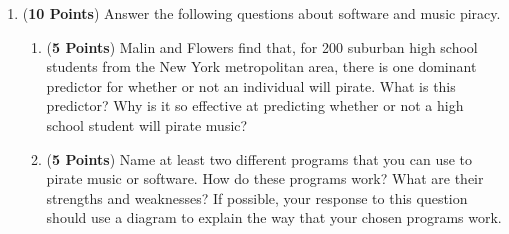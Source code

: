 \documentclass[12pt]{article}
\begin{document}
\begin{enumerate}
\newpage






\item ({\bf 10 Points}) Answer the following questions about software
  and music piracy.

\begin{enumerate}

\item ({\bf 5 Points}) Malin and Flowers find that, for 200 suburban
  high school students from the New York metropolitan area, there is
  one dominant predictor for whether or not an individual will pirate.
  What is this predictor?  Why is it so effective at predicting
  whether or not a high school student will pirate music?


\item ({\bf 5 Points}) Name at least two different programs that you
  can use to pirate music or software.  How do these programs work?
  What are their strengths and weaknesses?  If possible, your response
  to this question should use a diagram to explain the way that your
  chosen programs work.

\end{enumerate}

\newpage



\end{enumerate}
\end{document}
